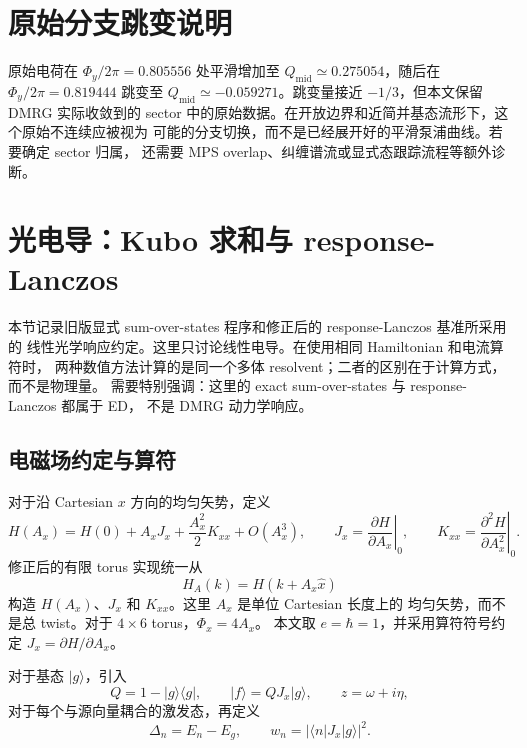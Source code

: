 \documentclass[11pt]{article}
\newcommand{\phitwopi}{\Phi_y/2\pi}
\newcommand{\qmid}{Q_{\mathrm{mid}}}
\begin{document}
\section{原始分支跳变说明}

原始电荷在 \(\phitwopi=0.805556\) 处平滑增加至
\(\qmid\simeq0.275054\)，随后在 \(\phitwopi=0.819444\) 跳变至
\(\qmid\simeq-0.059271\)。跳变量接近 \(-1/3\)，但本文保留 DMRG 实际收敛到的
sector 中的原始数据。在开放边界和近简并基态流形下，这个原始不连续应被视为
可能的分支切换，而不是已经展开好的平滑泵浦曲线。若要确定 sector 归属，
还需要 MPS overlap、纠缠谱流或显式态跟踪流程等额外诊断。

\clearpage
\section{光电导：Kubo 求和与 response-Lanczos}
\label{sec:optical-conductivity}

本节记录旧版显式 sum-over-states 程序和修正后的 response-Lanczos 基准所采用的
线性光学响应约定。这里只讨论线性电导。在使用相同 Hamiltonian 和电流算符时，
两种数值方法计算的是同一个多体 resolvent；二者的区别在于计算方式，而不是物理量。
需要特别强调：这里的 exact sum-over-states 与 response-Lanczos 都属于 ED，
不是 DMRG 动力学响应。

\subsection{电磁场约定与算符}

对于沿 Cartesian \(x\) 方向的均匀矢势，定义
\begin{equation}
  H(A_x)=H(0)+A_xJ_x+\frac{A_x^2}{2}K_{xx}+O(A_x^3),
  \qquad
  J_x=\left.\frac{\partial H}{\partial A_x}\right|_{0},
  \qquad
  K_{xx}=\left.\frac{\partial^2H}{\partial A_x^2}\right|_{0}.
  \label{eq:optical-operators}
\end{equation}
修正后的有限 torus 实现统一从
\begin{equation}
  H_A(k)=H(k+A_x\hat{x})
  \label{eq:bloch-ax}
\end{equation}
构造 \(H(A_x)\)、\(J_x\) 和 \(K_{xx}\)。这里 \(A_x\) 是单位 Cartesian 长度上的
均匀矢势，而不是总 twist。对于 \(4\times6\) torus，\(\Phi_x=4A_x\)。
本文取 \(e=\hbar=1\)，并采用算符符号约定
\(J_x=\partial H/\partial A_x\)。

对于基态 \(\lvert g\rangle\)，引入
\begin{equation}
  Q=1-\lvert g\rangle\langle g\rvert,
  \qquad
  \lvert f\rangle=QJ_x\lvert g\rangle,
  \qquad
  z=\omega+i\eta,
  \label{eq:response-source}
\end{equation}
对于每个与源向量耦合的激发态，再定义
\begin{equation}
  \Delta_n=E_n-E_g,
  \qquad
  w_n=\left|\langle n\rvert J_x\lvert g\rangle\right|^2.
\end{equation}
\end{document}
